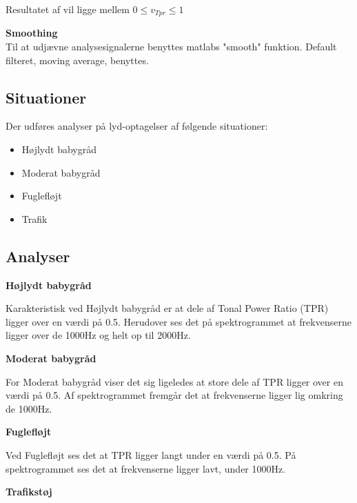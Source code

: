 Resultatet af vil ligge mellem $0\le { v }_{ Tpr }\le 1$

\textbf{Smoothing} \\
Til at udjævne analysesignalerne benyttes matlabs "smooth" funktion. Default filteret, moving average, benyttes.

\subsection{Situationer}
Der udføres analyser på lyd-optagelser af følgende situationer:
\begin{itemize}
	\item Højlydt babygråd
	\item Moderat babygråd
	\item Fuglefløjt
	\item Trafik
\end{itemize} 

\subsection{Analyser}
\textbf{Højlydt babygråd} \\

Karakteristisk ved Højlydt babygråd er at dele af Tonal Power Ratio (TPR) ligger over en værdi på 0.5. Herudover ses det på spektrogrammet at frekvenserne ligger over de 1000Hz og helt op til 2000Hz. 



\newpage
\textbf{Moderat babygråd}\\

For Moderat babygråd viser det sig ligeledes at store dele af TPR ligger over en værdi på 0.5. Af spektrogrammet fremgår det at frekvenserne ligger lig omkring de 1000Hz.

\newpage
\textbf{Fuglefløjt}\\

Ved Fuglefløjt ses det at TPR ligger langt under en værdi på 0.5. På spektrogrammet ses det at frekvenserne ligger lavt, under 1000Hz. 

\newpage
\textbf{Trafikstøj}\\


